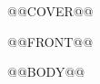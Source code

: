\documentclass[@@CLASSOPTS@@]{ctexart}
\begin{document}
@@COVER@@

@@FRONT@@

@@BODY@@
\end{document}
